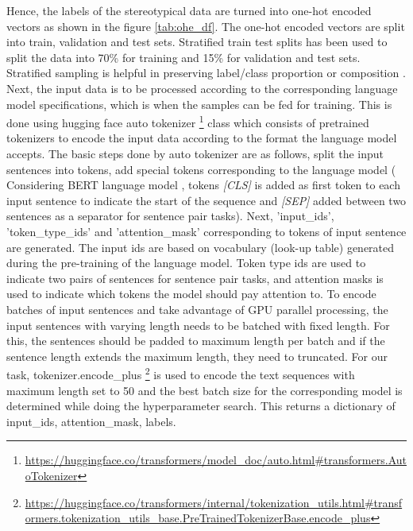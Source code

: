 Hence, the labels of the stereotypical data are turned into one-hot encoded vectors as shown in the figure \ref{tab:ohe_df}. The one-hot encoded vectors are split into train, validation and test sets. Stratified train test splits  has been used to split the data into 70\% for training and 15\% for validation and test sets. Stratified sampling is helpful in preserving label/class proportion or composition \cite{merrillees2021stratified}. Next, the input data is to be processed according to the corresponding language model specifications, which is when the samples can be fed for training. This is done using hugging face auto tokenizer \footnote{\url{https://huggingface.co/transformers/model_doc/auto.html#transformers.AutoTokenizer}} class which consists of pretrained tokenizers to encode the input data according to the format the language model accepts. The basic steps done by auto tokenizer are as follows, split the input sentences into tokens, add special tokens corresponding to the language model ( Considering BERT language model \cite{devlin2018bert}, tokens \textit{[CLS]} is  added as first token to each input sentence to indicate the start of the sequence and \textit{[SEP]} added between two sentences as a separator for sentence pair tasks). Next, 'input\_ids', 'token\_type\_ids' and 'attention\_mask' corresponding to tokens of input sentence are generated. The input ids are based on vocabulary (look-up table) generated during the pre-training of the language model. Token type ids are used to indicate two pairs of sentences for sentence pair tasks, and attention masks is used to indicate which tokens the model should pay attention to.  To encode batches of input sentences and take advantage of GPU parallel processing, the input sentences with varying length needs to be batched with fixed length. For this, the sentences should be padded to maximum length per batch and if the sentence length extends the maximum length, they need to truncated. For our task, tokenizer.encode\_plus \footnote{\url{https://huggingface.co/transformers/internal/tokenization_utils.html#transformers.tokenization_utils_base.PreTrainedTokenizerBase.encode_plus}} is used to encode the text sequences with maximum length set to 50 and the best batch size for the corresponding model is determined while doing the hyperparameter search. This returns a dictionary of input\_ids, attention\_mask, labels. 

